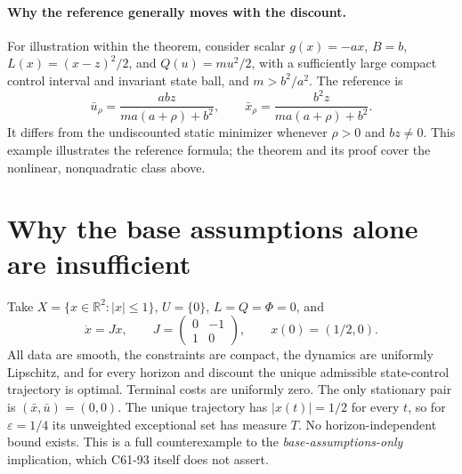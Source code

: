 \documentclass[11pt,a4paper]{article}
\newcommand{\R}{\mathbb R}
\begin{document}
\paragraph{Why the reference generally moves with the discount.}
For illustration within the theorem, consider scalar
$g(x)=-ax$, $B=b$, $L(x)=(x-z)^2/2$, and $Q(u)=mu^2/2$, with a sufficiently
large compact control interval and invariant state ball, and $m>b^2/a^2$.
The reference is
\[
 \bar u_\rho=\frac{abz}{ma(a+\rho)+b^2},\qquad
 \bar x_\rho=\frac{b^2z}{ma(a+\rho)+b^2}.
\]
It differs from the undiscounted static minimizer whenever
$\rho>0$ and $bz\ne0$. This example illustrates the reference formula;
the theorem and its proof cover the nonlinear, nonquadratic class above.

\section{Why the base assumptions alone are insufficient}
Take $X=\{x\in\R^2:|x|\leq1\}$, $U=\{0\}$, $L=Q=\Phi=0$, and
\[
 \dot x=Jx,\qquad
 J=\begin{pmatrix}0&-1\\1&0\end{pmatrix},\qquad x(0)=(1/2,0).
\]
All data are smooth, the constraints are compact, the dynamics are
uniformly Lipschitz, and for every horizon and discount the unique
admissible state-control trajectory is optimal. Terminal costs are
uniformly zero. The only stationary pair is $(\bar x,\bar u)=(0,0)$.
The unique trajectory has $|x(t)|=1/2$ for every $t$, so for
$\varepsilon=1/4$ its unweighted exceptional set has measure $T$.
No horizon-independent bound exists. This is a full counterexample to
the \emph{base-assumptions-only} implication, which C61-93 itself does
not assert.
\end{document}
